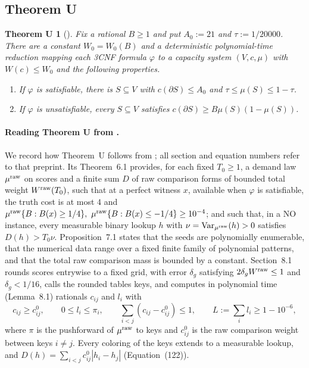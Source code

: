 \documentclass[11pt,letterpaper]{article}
\newtheorem*{theoremU}{Theorem U}
\theoremstyle{definition}
\theoremstyle{remark}
\DeclareMathOperator{\Var}{Var}
\begin{document}
\subsection{Theorem U}

\begin{theoremU}[\cite{oai26}]
Fix a rational \(B\ge1\) and put \(A_0:=21\) and \(\tau:=1/20000\). There
are a constant \(W_0=W_0(B)\) and a deterministic polynomial-time reduction
mapping each 3CNF formula \(\varphi\) to a capacity system \((V,c,\mu)\) with
\(W(c)\le W_0\) and the following properties.
\begin{enumerate}[label=\textup{(U\arabic*)}]
\item If \(\varphi\) is satisfiable, there is \(S\subseteq V\) with
\(c(\partial S)\le A_0\) and \(\tau\le\mu(S)\le1-\tau\).
\item If \(\varphi\) is unsatisfiable, every \(S\subseteq V\) satisfies
\(c(\partial S)\ge B\mu(S)(1-\mu(S))\).
\end{enumerate}
\end{theoremU}

\paragraph{Reading Theorem U from \cite{oai26}.}
We record how Theorem~U follows from \cite{oai26}; all section and equation
numbers refer to that preprint. Its Theorem~6.1 provides, for each fixed
\(T_0\ge1\), a demand law \(\mu^{\rm raw}\) on scores and a finite sum \(D\)
of raw comparison forms of bounded total weight \(W^{\rm raw}(T_0)\), such
that at a perfect witness \(x\), available when \(\varphi\) is satisfiable,
the truth cost is at most \(4\) and
\(\mu^{\rm raw}\{B:B(x)\ge1/4\},\ \mu^{\rm raw}\{B:B(x)\le-1/4\}\ge10^{-4}\);
and such that, in a NO instance, every measurable binary lookup \(h\) with
\(\nu=\Var_{\mu^{\rm raw}}(h)>0\) satisfies \(D(h)>T_0\nu\).
Proposition~7.1 states that the seeds are polynomially enumerable, that the
numerical data range over a fixed finite family of polynomial patterns, and
that the total raw comparison mass is bounded by a constant. Section~8.1
rounds scores entrywise to a fixed grid, with error \(\delta_g\) satisfying
\(2\delta_gW^{\rm raw}\le1\) and \(\delta_g<1/16\), calls the rounded tables
keys, and computes in polynomial time (Lemma~8.1) rationals \(c_{ij}\) and
\(l_i\) with
\[
c_{ij}\ge c^0_{ij},\qquad 0\le l_i\le\pi_i,\qquad
\sum_{i<j}(c_{ij}-c^0_{ij})\le1,\qquad L:=\sum_il_i\ge1-10^{-6},
\]
where \(\pi\) is the pushforward of \(\mu^{\rm raw}\) to keys and
\(c^0_{ij}\) is the raw comparison weight between keys \(i\ne j\). Every
coloring of the keys extends to a measurable lookup, and
\(D(h)=\sum_{i<j}c^0_{ij}|h_i-h_j|\) (Equation~(122)).
\end{document}
